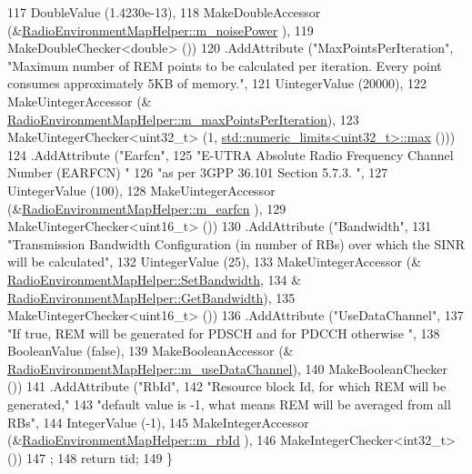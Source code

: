 \begin{DoxyCode}
117                    DoubleValue (1.4230e-13),
118                    MakeDoubleAccessor (&\hyperlink{classns3_1_1RadioEnvironmentMapHelper_a53457bd86b23a6772f9bcf03d93e9de8}{RadioEnvironmentMapHelper::m\_noisePower}
      ),
119                    MakeDoubleChecker<double> ())
120     .AddAttribute (\textcolor{stringliteral}{"MaxPointsPerIteration"}, \textcolor{stringliteral}{"Maximum number of REM points to be calculated per iteration.
       Every point consumes approximately 5KB of memory."},
121                    UintegerValue (20000),
122                    MakeUintegerAccessor (&
      \hyperlink{classns3_1_1RadioEnvironmentMapHelper_ab1dad1405a279b94c4c728c64c2b98cc}{RadioEnvironmentMapHelper::m\_maxPointsPerIteration}),
123                    MakeUintegerChecker<uint32\_t> (1,
      \hyperlink{80211b_8c_affe776513b24d84b39af8ab0930fef7f}{std::numeric\_limits<uint32\_t>::max} ()))
124     .AddAttribute (\textcolor{stringliteral}{"Earfcn"},
125                    \textcolor{stringliteral}{"E-UTRA Absolute Radio Frequency Channel Number (EARFCN) "}
126                    \textcolor{stringliteral}{"as per 3GPP 36.101 Section 5.7.3. "},
127                    UintegerValue (100),
128                    MakeUintegerAccessor (&\hyperlink{classns3_1_1RadioEnvironmentMapHelper_aa04a4e6e1f216f95e3074120101e9d95}{RadioEnvironmentMapHelper::m\_earfcn}
      ),
129                    MakeUintegerChecker<uint16\_t> ())
130     .AddAttribute (\textcolor{stringliteral}{"Bandwidth"},
131                    \textcolor{stringliteral}{"Transmission Bandwidth Configuration (in number of RBs) over which the SINR will be
       calculated"},
132                    UintegerValue (25),
133                    MakeUintegerAccessor (&
      \hyperlink{classns3_1_1RadioEnvironmentMapHelper_a3818c700f2bc75e39374eff67023eb22}{RadioEnvironmentMapHelper::SetBandwidth}, 
134                                          &
      \hyperlink{classns3_1_1RadioEnvironmentMapHelper_aede732e2c1ffbb548c640ac7fc40bfc4}{RadioEnvironmentMapHelper::GetBandwidth}),
135                    MakeUintegerChecker<uint16\_t> ())
136     .AddAttribute (\textcolor{stringliteral}{"UseDataChannel"},
137                    \textcolor{stringliteral}{"If true, REM will be generated for PDSCH and for PDCCH otherwise "},
138                    BooleanValue (\textcolor{keyword}{false}),
139                    MakeBooleanAccessor (&
      \hyperlink{classns3_1_1RadioEnvironmentMapHelper_a498cc85b6a5abb1eee18c95274963c45}{RadioEnvironmentMapHelper::m\_useDataChannel}),
140                    MakeBooleanChecker ())
141     .AddAttribute (\textcolor{stringliteral}{"RbId"},
142                    \textcolor{stringliteral}{"Resource block Id, for which REM will be generated,"}
143                    \textcolor{stringliteral}{"default value is -1, what means REM will be averaged from all RBs"},
144                    IntegerValue (-1),
145                    MakeIntegerAccessor (&\hyperlink{classns3_1_1RadioEnvironmentMapHelper_a380539755840ad027fadec5d78b58ae5}{RadioEnvironmentMapHelper::m\_rbId}
      ),
146                    MakeIntegerChecker<int32\_t> ())
147   ;
148   \textcolor{keywordflow}{return} tid;
149 \}
\end{DoxyCode}


